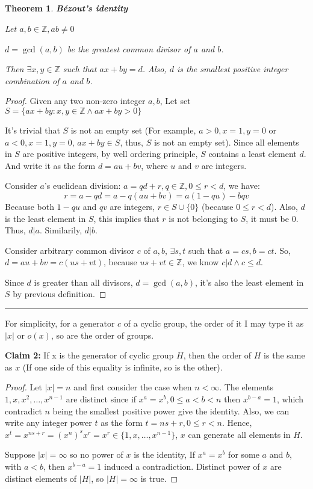 \documentclass[12pt]{article}
\newtheorem{theorem}{Theorem}
\begin{document}
\subsection{} %
\begin{theorem} \textbf{Bézout's identity}

Let $a,b\in\mathbb{Z},ab\ne0$

$d=\gcd{(a,b)}$ be the greatest common divisor of $a$ and $b$. 

Then $\exists x,y\in\mathbb{Z}$ such that $ax+by=d$. Also, $d$ is the smallest positive integer combination of $a$ and $b$.
\end{theorem}
\begin{proof}

Given any two non-zero integer $a,b$, Let set $S=\{ax+by:x,y\in\mathbb{Z}\land ax+by>0\}$

It's trivial that $S$ is not an empty set (For example, $a>0,x=1,y=0$ or $a<0,x=1,y=0$, $ax+by\in S$, thus, $S$ is not an empty set). Since all elements in $S$ are positive integers, by well ordering principle, $S$ contains a least element $d$. And write it as the form $d=au+bv$, where $u$ and $v$ are integers.

Consider $a$'s euclidean division: $a=qd+r, q\in\mathbb{Z}, 0\le r < d$, we have:
\[r=a-qd=a-q(au+bv)=a(1-qu)-bqv\]
Because both $1-qu$ and $qv$ are integers, $r\in S\cup \{0\}$ (because $0\le r < d$). Also, $d$ is the least element in $S$, this implies that $r$ is not belonging to $S$, it must be $0$. Thus, $d|a$. Similarily, $d|b$.

Consider arbitrary common divisor $c$ of $a,b$, $\exists s,t$ such that $a=cs,b=ct$. So, $d=au+bv=c(us+vt)$, because $us+vt\in \mathbb{Z}$, we know $c|d\land c\le d$.

Since $d$ is greater than all divisors, $d=\gcd{(a,b)}$, it's also the least element in $S$ by previous definition.
\end{proof}

\noindent\rule{\textwidth}{1pt}
For simplicity, for a generator $c$ of a cyclic group, the order of it I may type it as $|x|$ or $o(x)$, so are the order of groups.

\noindent \textbf{Claim 2: } If x is the generator of cyclic group $H$, then the order of $H$ is the same as $x$ (If one side of this equality is infinite, so is the other).
\begin{proof}
Let $|x|=n$ and first consider the case when $n<\infty$. The elements $1,x,x^2,\dots,x^{n-1}$ are distinct since if $x^a=x^b,0\le a<b<n$ then $x^{b-a}=1$, which contradict $n$ being the smallest positive power give the identity. Also, we can write any integer power $t$ as the form $t=ns+r,0\le r<n$. Hence, $x^t=x^{ns+r}=(x^n)^sx^r=x^r\in\{1,x,\dots,x^{n-1}\}$, $x$ can generate all elements in $H$.

Suppose $|x|=\infty$ so no power of $x$ is the identity, If $x^a=x^b$ for some $a$ and $b$, with $a<b$, then $x^{b-a}=1$ induced a contradiction. Distinct power of $x$ are distinct elements of $|H|$, so $|H|=\infty$ is true.
\end{proof}
\end{document}
